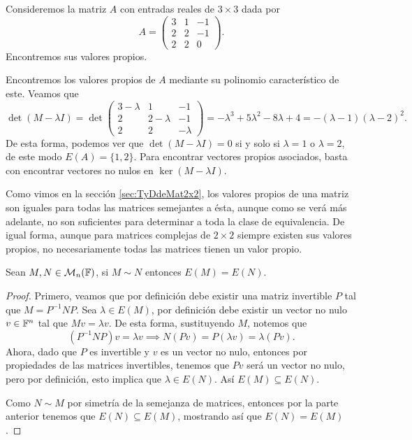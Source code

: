 \begin{example}
  Consideremos la matriz $A$ con entradas reales de $3 \times 3$ dada por
  \[
    A = \begin{pmatrix} 3 & 1 & -1 \\ 2 & 2 & -1 \\ 2 & 2 & 0 \end{pmatrix}.
  \]
  Encontremos sus valores propios.

  \examplesolution

  Encontremos los valores propios de $A$ mediante su polinomio característico de este. Veamos que
  \[
    \det(M - \lambda I) = \det\begin{pmatrix} 3 - \lambda & 1 & -1 \\ 2 & 2 - \lambda & -1 \\ 2 & 2 & -\lambda \end{pmatrix}
      = -\lambda^3+5\lambda^2-8\lambda+4 = -(\lambda-1)(\lambda-2)^2.
  \]
  De esta forma, podemos ver que $\det(M - \lambda I) = 0$ si y solo si $\lambda=1$ o $\lambda = 2$, de este modo $E(A) = \{1, 2\}$. Para encontrar vectores propios asociados, basta con encontrar vectores no nulos en $\ker(M-\lambda I)$.
\end{example}

Como vimos en la sección \ref{sec:TyDdeMat2x2}, los valores propios de una matriz son iguales para todas las matrices semejantes a ésta, aunque como se verá más adelante, no son suficientes para determinar a toda la clase de equivalencia. De igual forma, aunque para matrices complejas de $2\times 2$ siempre existen sus valores propios, no necesariamente todas las matrices tienen un valor propio.

\begin{teor}\label{teor:SemEspectro}
  Sean $M,N \in \mathcal{M}_n(\mathbb{F})$, si $M \sim N$ entonces $E(M) = E(N)$.
\end{teor}
\begin{proof}
  Primero, veamos que por definición debe existir una matriz invertible $P$ tal que $M = P^{-1} N P$. Sea $\lambda \in E(M)$, por definición debe existir un vector no nulo $v \in \mathbb{F}^n$ tal que $Mv = \lambda v$. De esta forma, sustituyendo $M$, notemos que
    \[ ( P^{-1} N P) v =  \lambda v  \implies  N(Pv) = P(\lambda v) = \lambda (Pv). \]
  Ahora, dado que $P$ es invertible y $v$ es un vector no nulo, entonces por propiedades de las matrices invertibles, tenemos que $Pv$ será un vector no nulo, pero por definición, esto implica que $\lambda \in E(N)$. Así $E(M) \subseteq E(N)$.

  Como $N \sim M$ por simetría de la semejanza de matrices, entonces por la parte anterior tenemos que $E(N) \subseteq E(M)$, mostrando así que $E(N) = E(M)$.
\end{proof}